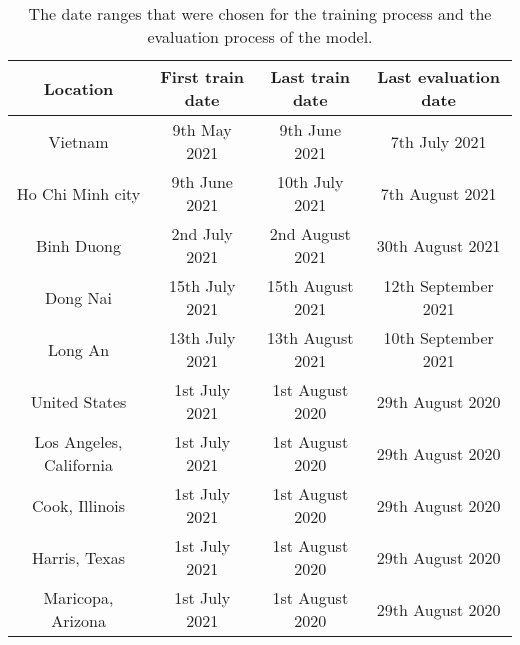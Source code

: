 \begin{table}[h]
    \centering
    \begin{tabular}{| c | c | c | c |}
        Location & First train date & Last train date & Last evaluation date \\
        \hline\hline
        Vietnam & 9th May 2021 & 9th June 2021 & 7th July 2021 \\
        \hline
        Ho Chi Minh city & 9th June 2021 & 10th July 2021 & 7th August 2021 \\
        \hline
        Binh Duong & 2nd July 2021 & 2nd August 2021 & 30th August 2021 \\
        \hline
        Dong Nai & 15th July 2021 & 15th August 2021 & 12th September 2021 \\
        \hline
        Long An & 13th July 2021 & 13th August 2021 & 10th September 2021 \\
        \hline
        United States & 1st July 2021 & 1st August 2020 & 29th August 2020 \\
        \hline
        Los Angeles, California & 1st July 2021 & 1st August 2020 & 29th August 2020 \\
        \hline
        Cook, Illinois & 1st July 2021 & 1st August 2020 & 29th August 2020 \\
        \hline
        Harris, Texas & 1st July 2021 & 1st August 2020 & 29th August 2020 \\
        \hline
        Maricopa, Arizona & 1st July 2021 & 1st August 2020 & 29th August 2020 \\
        \hline
    \end{tabular}
    \caption{The date ranges that were chosen for the training process and the evaluation process of the model.}
    \label{tab:chosen-dataset-dates}
\end{table}

